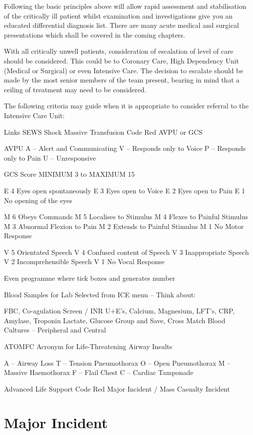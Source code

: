 \documentclass[]{book}
\begin{document}
Following the basic principles above will allow rapid assessment and stabilisation of the critically ill patient whilst examination and investigations give you an educated differential diagnosis list. There are many acute medical and surgical presentations which shall be covered in the coming chapters.

With all critically unwell patients, consideration of escalation of level of care should be considered. This could be to Coronary Care, High Dependency Unit (Medical or Surgical) or even Intensive Care. The decision to escalate should be made by the most senior members of the team present, bearing in mind that a ceiling of treatment may need to be considered.

The following criteria may guide when it is appropriate to consider referral to the Intensive Care Unit:

Links
SEWS
Shock
Massive Transfusion
Code Red
AVPU or GCS

AVPU
A -- Alert and Communicating
V -- Responds only to Voice
P -- Responds only to Pain
U -- Unresponsive

GCS
Score MINIMUM 3 to MAXIMUM 15

E 4 Eyes open spontaneously
E 3 Eyes open to Voice
E 2 Eyes open to Pain
E 1 No opening of the eyes

M 6 Obeys Commands
M 5 Localises to Stimulus
M 4 Flexes to Painful Stimulus
M 3 Abnormal Flexion to Pain
M 2 Extends to Painful Stimulus
M 1 No Motor Response

V 5 Orientated Speech
V 4 Confused content of Speech
V 3 Inappropriate Speech
V 2 Incomprehensible Speech
V 1 No Vocal Response

Even programme where tick boxes and generates number

Blood Samples for Lab
Selected from ICE menu -- Think about:

FBC, Co-agulation Screen / INR
U+E's, Calcium, Magnesium, LFT's, CRP, Amylase, Troponin
Lactate, Glucose
Group and Save, Cross Match
Blood Cultures -- Peripheral and Central

ATOMFC
Acronym for Life-Threatening Airway Insults

A -- Airway Loss
T -- Tension Pneumothorax
O -- Open Pneumothorax
M -- Massive Haemothorax
F -- Flail Chest
C -- Cardiac Tamponade

Advanced Life Support
Code Red
Major Incident / Mass Casualty Incident

\hypertarget{major-incident}{%
\section{Major Incident}\label{major-incident}}
\end{document}
